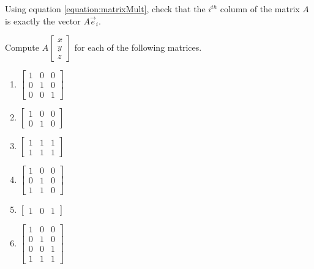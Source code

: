 \begin{qbox}
  Using equation \eqref{equation:matrixMult}, check that the $i^{th}$ column of the matrix $A$ is exactly the vector $A\vec{e}_i$.
\end{qbox}

\begin{qbox}
  Compute $A \begin{bmatrix} x \\ y \\ z \end{bmatrix}$ for each of the following matrices.
  \begin{multicols}{2}
    \begin{enumerate}
      \item $ \begin{bmatrix} 1 & 0 & 0 \\ 0 & 1 & 0 \\ 0 & 0 & 1 \end{bmatrix}$
      \item $ \begin{bmatrix} 1 & 0 & 0 \\ 0 & 1 & 0 \end{bmatrix}$
      \item $ \begin{bmatrix} 1 & 1 & 1 \\ 1 & 1 & 1 \end{bmatrix}$
      \item $ \begin{bmatrix} 1 & 0 & 0 \\ 0 & 1 & 0 \\ 1 & 1 & 0\end{bmatrix}$
      \item $\begin{bmatrix} 1 & 0 & 1 \end{bmatrix}$
      \item $ \begin{bmatrix} 1 & 0 & 0 \\ 0 & 1 & 0 \\ 0 & 0 & 1 \\ 1 & 1 & 1\end{bmatrix}$
    \end{enumerate}
  \end{multicols}
\end{qbox}















